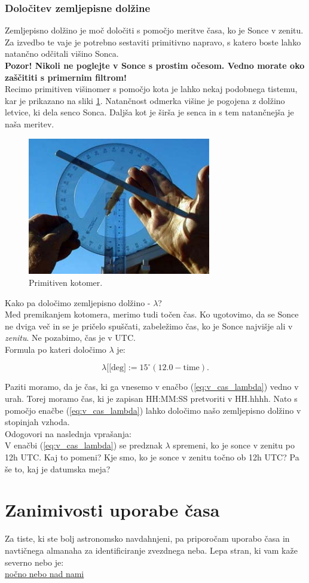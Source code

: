 \subsubsection{Določitev zemljepisne dolžine}
Zemljepisno dolžino je moč določiti s pomočjo meritve časa, ko je Sonce v zenitu. Za izvedbo te vaje je potrebno sestaviti primitivno napravo, s katero boste lahko natančno odčitali višino Sonca.\\[2mm]
%
\textbf{Pozor! Nikoli ne poglejte v Sonce s prostim očesom. Vedno morate oko zaščititi s primernim filtrom!}\\[2mm]
%
Recimo primitiven višinomer s pomočjo kota je lahko nekaj podobnega tistemu, kar je prikazano na sliki \ref{fig:v_cas_kotomer}. Natančnost odmerka višine je pogojena z dolžino letvice, ki dela senco Sonca. Daljša kot je širša je senca in s tem natančnejša je naša meritev. 
%
\begin{figure}[!htbp]
	\centering \includegraphics[width=8cm]{Vaje/CasPomorstvo/figs/kotomer.jpg}
	\caption{Primitiven kotomer.}
	\label{fig:v_cas_kotomer}
\end{figure}
%
Kako pa določimo zemljepisno dolžino - $\lambda$?\\[2mm]
%
Med premikanjem kotomera, merimo tudi točen čas. Ko ugotovimo, da se Sonce ne dviga več in se je pričelo spuščati, zabeležimo čas, ko je Sonce najvišje ali v \emph{zenitu}. Ne pozabimo, čas je v UTC.\\[2mm]
%
Formula po kateri določimo $\lambda$ je:

\begin{equation}
\label{eq:v_cas_lambda} 
\lambda[\text{[deg]} := 15^\circ \left( 12.0 - \text{time} \right).
\end{equation}

Paziti moramo, da je čas, ki ga vnesemo v enačbo (\ref{eq:v_cas_lambda}) vedno v urah. Torej moramo čas, ki je zapisan HH:MM:SS pretvoriti v HH.hhhh. Nato s pomočjo enačbe (\ref{eq:v_cas_lambda}) lahko določimo našo zemljepisno dolžino v stopinjah vzhoda.\\[2mm]
%
Odogovori na naslednja vprašanja:\\[2mm]
V enačbi (\ref{eq:v_cas_lambda}) se predznak $\lambda$ spremeni, ko je sonce v zenitu po 12h UTC. Kaj to pomeni? Kje smo, ko je sonce v zenitu točno ob 12h UTC? Pa še to, kaj je datumska meja?

\section{Zanimivosti uporabe časa}
Za tiste, ki ste bolj astronomsko navdahnjeni, pa priporočam uporabo časa in navtičnega almanaha za identificiranje zvezdnega neba. Lepa stran, ki vam kaže severno nebo je:\\[2mm]
%
\href{http://www.jodcast.net/sky}{nočno nebo nad nami}
%
